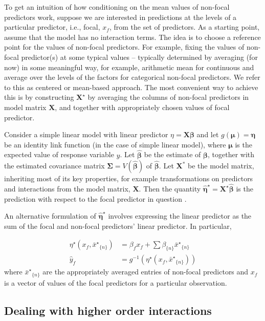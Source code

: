 \documentclass[10pt,letterpaper]{article}
\newcommand{\bX}{{\mathbf X}}
\newcommand{\bbeta}{{\boldsymbol \beta}}
\newcommand{\boldeta}{{\boldsymbol \eta}}
\newcommand{\boldmu}{{\boldsymbol \mu}}
\newcommand{\nset}[1]{#1_{\{n\}}}
\begin{document}
To get an intuition of how conditioning on the mean values of non-focal predictors work, suppose we are interested in predictions at the levels of a particular predictor, i.e., focal, $x_f$, from the set of predictors. As a starting point, assume that the model has no interaction terms. The idea is to choose a reference point for the values of non-focal predictors. For example, fixing the values of non-focal predictor(s) at some typical values -- typically determined by averaging (for now) in some meaningful way, for example, arithmetic mean  for continuous and average over the levels of the factors for categorical non-focal predictors. We refer to this as centered or mean-based approach. The most convenient way to achieve this is by constructing $\bX^\star$ by averaging the columns of non-focal predictors in model matrix $\bX$, and together with appropriately chosen values of focal predictor.


Consider a simple linear model with linear predictor $\eta = \bX\bbeta$ and let $g(\boldmu) = \boldeta$ be an identity link function (in the case of simple linear model), where $\boldmu$ is the expected value of response variable $y$. Let $\hat{\bbeta}$ be the estimate of $\bbeta$, together with the estimated covariance matrix $\boldsymbol{\Sigma} = V(\hat{\bbeta})$ of $\hat{\bbeta}$. Let $\mathbf{X^*}$ be the model matrix, inheriting most of its key properties, for example transformations on predictors and interactions from the model matrix, $\mathbf{X}$. Then the quantity $\hat{\boldeta}^\star = \bX^\star\hat{\bbeta}$ is the prediction with respect to the focal predictor in question \cite{fox2009effect}.

An alternative formulation of $\hat{\boldeta}^\star$ involves expressing the linear predictor as the sum of the focal and non-focal predictors' linear predictor. In particular, 

\begin{align}\label{eq:eta_mean}
\eta^\star(x_f, \nset{{\bar{x}^\star}}) &= \beta_f x_f + \sum \nset{\beta} \nset{{\bar{x}^\star}} \\
\hat{y}_f  &= g^{-1} \left(\eta^\star(x_f, \nset{{\bar{x}^\star}})\right)
\end{align}
where $\nset{{\bar{x}^\star}}$ are the appropriately averaged entries of non-focal predictors and $x_f$ is a vector of values of the focal predictors for a particular observation.


\subsection*{Dealing with higher order interactions}
\end{document}
